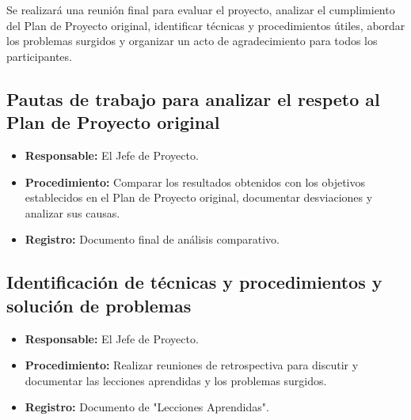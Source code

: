%
%


Se realizará una reunión final para evaluar el proyecto, analizar el cumplimiento del Plan de Proyecto original, identificar técnicas y procedimientos útiles, abordar los problemas surgidos y organizar un acto de agradecimiento para todos los participantes.

\subsection{Pautas de trabajo para analizar el respeto al Plan de Proyecto original}
\begin{itemize}
	\item \textbf{Responsable:} El Jefe de Proyecto.
	\item \textbf{Procedimiento:} Comparar los resultados obtenidos con los objetivos establecidos en el Plan de Proyecto original, documentar desviaciones y analizar sus causas.
	\item \textbf{Registro:} Documento final de análisis comparativo.
\end{itemize}

\subsection{Identificación de técnicas y procedimientos y solución de problemas}
\begin{itemize}
	\item \textbf{Responsable:} El Jefe de Proyecto.
	\item \textbf{Procedimiento:} Realizar reuniones de retrospectiva para discutir y documentar las lecciones aprendidas y los problemas surgidos.
	\item \textbf{Registro:} Documento de "Lecciones Aprendidas".
\end{itemize}

